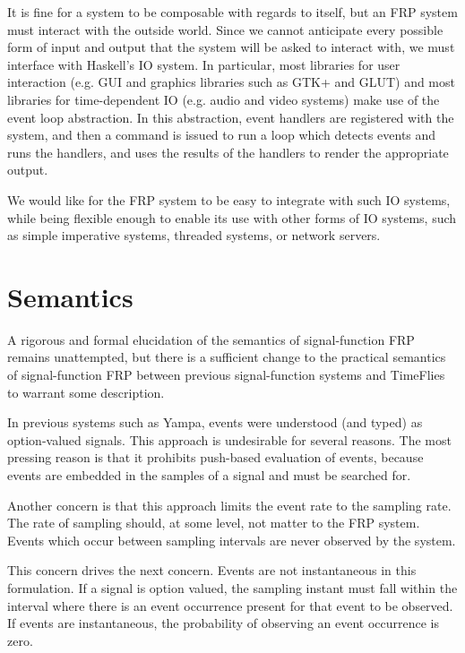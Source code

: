 It is fine for a system to be composable with regards to itself, but an FRP
system must interact with the outside world. Since we cannot anticipate every
possible form of input and output that the system will be asked to interact
with, we must interface with Haskell's IO system. In particular, most libraries
for user interaction (e.g. GUI and graphics libraries such as GTK+ and GLUT) and
most libraries for time-dependent IO (e.g. audio and video systems) make use of
the event loop abstraction. In this abstraction, event handlers are registered
with the system, and then a command is issued to run a loop which detects events
and runs the handlers, and uses the results of the handlers to render the
appropriate output. 

We would like for the FRP system to be easy to integrate with such IO systems,
while being flexible enough to enable its use with other forms of IO systems,
such as simple imperative systems, threaded systems, or network servers.

\section{Semantics}
\label{section:System_Design_and_Interface-Semantics}

A rigorous and formal elucidation of the semantics of signal-function FRP remains
unattempted, but there is a sufficient change to the practical semantics of
signal-function FRP between previous signal-function systems and TimeFlies to warrant
some description.

In previous systems such as Yampa, events were understood (and typed) as option-valued
signals. This approach is undesirable for several reasons. The most pressing reason is
that it prohibits push-based evaluation of events, because events are embedded in the
samples of a signal and must be searched for.

Another concern is that this approach limits the event rate to the sampling rate.
The rate of sampling should, at some level, not matter to the FRP system. Events which
occur between sampling intervals are never observed by the system.

This concern drives the next concern. Events are not instantaneous in this formulation.
If a signal is option valued, the sampling instant must fall within the interval where
there is an event occurrence present for that event to be observed. If events are
instantaneous, the probability of observing an event occurrence is zero.


